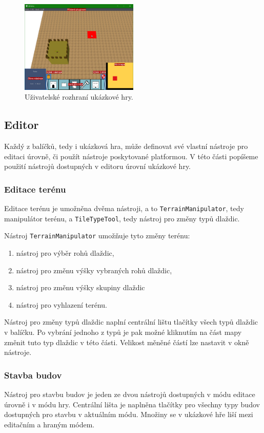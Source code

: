 \begin{figure}[h]
	\centering
	\includegraphics[width=0.5\textwidth]{img/GameUI.png}
	\caption{Uživatelské rozhraní ukázkové hry.}
	\label{fig:UI}
\end{figure}

\subsection{Editor}
Každý z balíčků, tedy i ukázková hra, může definovat své vlastní nástroje pro editaci úrovně, či použít nástroje poskytované platformou. V této části popíšeme použití nástrojů dostupných v editoru úrovní ukázkové hry.

\subsubsection{Editace terénu}
Editace terénu je umožněna dvěma nástroji, a to \texttt{TerrainManipulator}, tedy manipulátor terénu, a \texttt{TileTypeTool}, tedy nástroj pro změny typů dlaždic. 

Nástroj \texttt{TerrainManipulator} umožňuje tyto změny terénu:

\begin{enumerate}
	\item nástroj pro výběr rohů dlaždic,
	\item nástroj pro změnu výšky vybraných rohů dlaždic,
	\item nástroj pro změnu výšky skupiny dlaždic
	\item nástroj pro vyhlazení terénu.
\end{enumerate}

Nástroj pro změny typů dlaždic naplní centrální lištu tlačítky všech typů dlaždic v balíčku. Po vybrání jednoho z typů je pak možné kliknutím na část mapy změnit tuto typ dlaždic v této části. Velikost měněné částí lze nastavit v okně nástroje.

\subsubsection{Stavba budov}
Nástroj pro stavbu budov je jeden ze dvou nástrojů dostupných v módu editace úrovně i v módu hry. Centrální lišta je naplněna tlačítky pro všechny typy budov dostupných pro stavbu v aktuálním módu. Množiny se v ukázkové hře liší mezi editačním a hraným módem.

